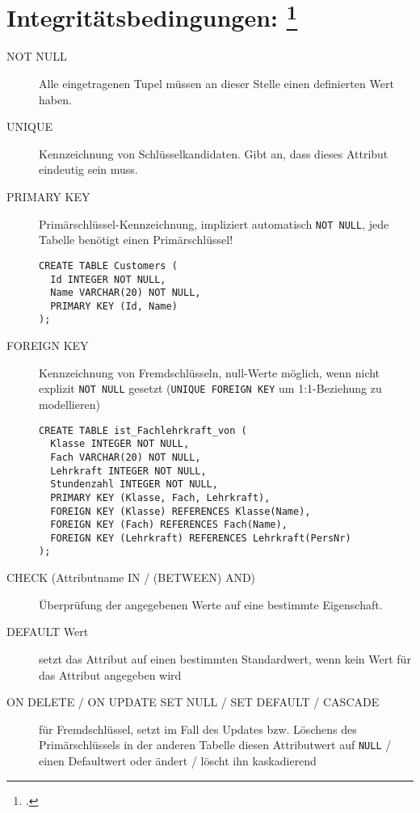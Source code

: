 \documentclass{bschlangaul-theorie}
\begin{document}
\section{Integritätsbedingungen:
\footcite[Seite 7]{db:fs:2}}

\begin{description}

\item[NOT NULL]

Alle eingetragenen Tupel müssen an dieser Stelle einen definierten Wert
haben.

\item[UNIQUE]

Kennzeichnung von Schlüsselkandidaten. Gibt an, dass dieses Attribut
eindeutig sein muss.

\item[PRIMARY KEY]

Primärschlüssel-Kennzeichnung, impliziert automatisch \verb|NOT NULL|,
jede Tabelle benötigt einen Primärschlüssel!

\begin{verbatim}
CREATE TABLE Customers (
  Id INTEGER NOT NULL,
  Name VARCHAR(20) NOT NULL,
  PRIMARY KEY (Id, Name)
);
\end{verbatim}

\item[FOREIGN KEY]

Kennzeichnung von Fremdschlüsseln, null-Werte möglich, wenn nicht
explizit \verb|NOT NULL| gesetzt (\verb|UNIQUE FOREIGN KEY| um
1:1-Beziehung zu modellieren)

\begin{verbatim}
CREATE TABLE ist_Fachlehrkraft_von (
  Klasse INTEGER NOT NULL,
  Fach VARCHAR(20) NOT NULL,
  Lehrkraft INTEGER NOT NULL,
  Stundenzahl INTEGER NOT NULL,
  PRIMARY KEY (Klasse, Fach, Lehrkraft),
  FOREIGN KEY (Klasse) REFERENCES Klasse(Name),
  FOREIGN KEY (Fach) REFERENCES Fach(Name),
  FOREIGN KEY (Lehrkraft) REFERENCES Lehrkraft(PersNr)
);
\end{verbatim}

\item[CHECK (Attributname IN / (BETWEEN) AND)]

Überprüfung der angegebenen Werte auf eine bestimmte Eigenschaft.

\item[DEFAULT Wert]

setzt das Attribut auf einen bestimmten Standardwert, wenn kein Wert für
das Attribut angegeben wird

\item[ON DELETE / ON UPDATE SET NULL / SET DEFAULT / CASCADE]

für Fremdschlüssel, setzt im Fall des Updates bzw. Löschens des
Primärschlüssels in der anderen Tabelle diesen Attributwert auf
\verb|NULL| / einen Defaultwert oder ändert / löscht ihn kaskadierend
\end{description}
\end{document}
